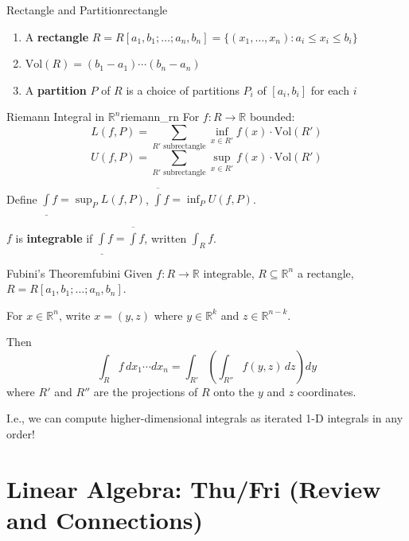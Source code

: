 \documentclass[11pt, letterpaper, openany]{book}
\begin{document}
\begin{defn}{Rectangle and Partition}{rectangle}
\begin{enumerate}
    \item A \textbf{rectangle} $R = R[a_1, b_1; \ldots; a_n, b_n] = \{(x_1, \ldots, x_n) : a_i \leq x_i \leq b_i\}$
    \item $\text{Vol}(R) = (b_1 - a_1) \cdots (b_n - a_n)$
    \item A \textbf{partition} $P$ of $R$ is a choice of partitions $P_i$ of $[a_i, b_i]$ for each $i$
\end{enumerate}
\end{defn}

\begin{defn}{Riemann Integral in $\mathbb{R}^n$}{riemann_rn}
For $f: R \to \mathbb{R}$ bounded:
\[L(f, P) = \sum_{R' \text{ subrectangle}} \inf_{x \in R'} f(x) \cdot \text{Vol}(R')\]
\[U(f, P) = \sum_{R' \text{ subrectangle}} \sup_{x \in R'} f(x) \cdot \text{Vol}(R')\]

Define $\underline{\int} f = \sup_P L(f,P)$, $\overline{\int} f = \inf_P U(f,P)$.

$f$ is \textbf{integrable} if $\underline{\int} f = \overline{\int} f$, written $\int_R f$.
\end{defn}

\begin{thm}{Fubini's Theorem}{fubini}
Given $f: R \to \mathbb{R}$ integrable, $R \subseteq \mathbb{R}^n$ a rectangle, $R = R[a_1, b_1; \ldots; a_n, b_n]$.

For $x \in \mathbb{R}^n$, write $x = (y, z)$ where $y \in \mathbb{R}^k$ and $z \in \mathbb{R}^{n-k}$.

Then
\[\int_R f \, dx_1 \cdots dx_n = \int_{R'} \left(\int_{R''} f(y, z) \, dz\right) dy\]
where $R'$ and $R''$ are the projections of $R$ onto the $y$ and $z$ coordinates.

I.e., we can compute higher-dimensional integrals as iterated 1-D integrals in any order!
\end{thm}

\section{Linear Algebra: Thu/Fri (Review and Connections)}
\end{document}
